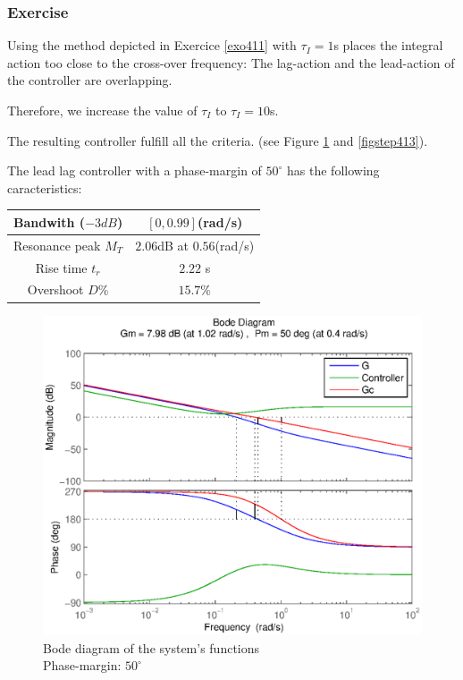 \subsubsection{Exercise}

Using the method depicted in Exercice \ref{exo411} with $\tau_I = 1$s places the integral action too close to the cross-over frequency: The lag-action and the lead-action of the controller are overlapping.

Therefore, we increase the value of $\tau_I$ to $\tau_I = 10$s.

The resulting controller fulfill all the criteria. (see Figure \ref{figbode413} and \ref{figstep413}).

The lead lag controller with a phase-margin of $50^{\circ}$ has the following caracteristics:
\begin{center}
\begin{tabular}{|c|c|}
    \hline
    Bandwith ($-3dB$) & $[0,0.99]$(rad/s)\\
    \hline
    Resonance peak $M_T$ & $2.06$dB at $0.56$(rad/s)\\
    \hline
    Rise time $t_r$ & $2.22$ s\\
    \hline
    Overshoot $D$\% & $15.7$\%\\
    \hline
\end{tabular}
\end{center}

\begin{figure}[h!t]
   \includegraphics[width=\columnwidth]{fig/bode413.eps}
    \caption{Bode diagram of the system's functions \\ Phase-margin: $50^{\circ}$} 
    \label{figbode413}
\end{figure}

